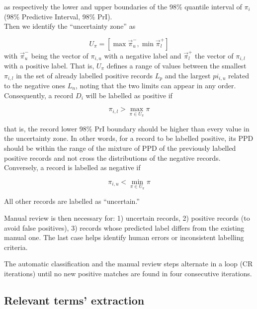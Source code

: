 \documentclass{article}
\begin{document}
as respectively the lower and upper boundaries of the 98\% quantile
interval of \(\pi_i\) (98\% Predictive Interval, 98\% PrI).\\
Then we identify the ``uncertainty zone'' as

\[U_\pi=[\max\vec{\pi}_{u}^-, \min\vec{\pi}_{l}^+]\] with
\(\vec{\pi}_{u}^-\) being the vector of \(\pi_{i,u}\) with a negative
label and \(\vec{\pi}_{l}^+\) the vector of \(\pi_{i,l}\) with a
positive label. That is, \(U_\pi\) defines a range of values between the
smallest \(\pi_{i,l}\) in the set of already labelled positive records
\(L_p\) and the largest \(pi_{i,u}\) related to the negative ones
\(L_n\), noting that the two limits can appear in any order.\\
Consequently, a record \(D_i\) will be labelled as positive if

\[\pi_{i,l} > \max_{\pi \in U_\pi} \pi\]

that is, the record lower 98\% PrI boundary should be higher than every
value in the uncertainty zone. In other words, for a record to be
labelled positive, its PPD should be within the range of the mixture of
PPD of the previously labelled positive records and not cross the
distributions of the negative records.\\
Conversely, a record is labelled as negative if

\[\pi_{i,u} < \min_{\pi \in U_\pi} \pi\]

All other records are labelled as ``uncertain.''

Manual review is then necessary for: 1) uncertain records, 2) positive
records (to avoid false positives), 3) records whose predicted label
differs from the existing manual one. The last case helps identify human
errors or inconsistent labelling criteria.

The automatic classification and the manual review steps alternate in a
loop (CR iterations) until no new positive matches are found in four
consecutive iterations.

\hypertarget{relevant-terms-extraction}{%
\subsection{Relevant terms'
extraction}\label{relevant-terms-extraction}}
\end{document}
